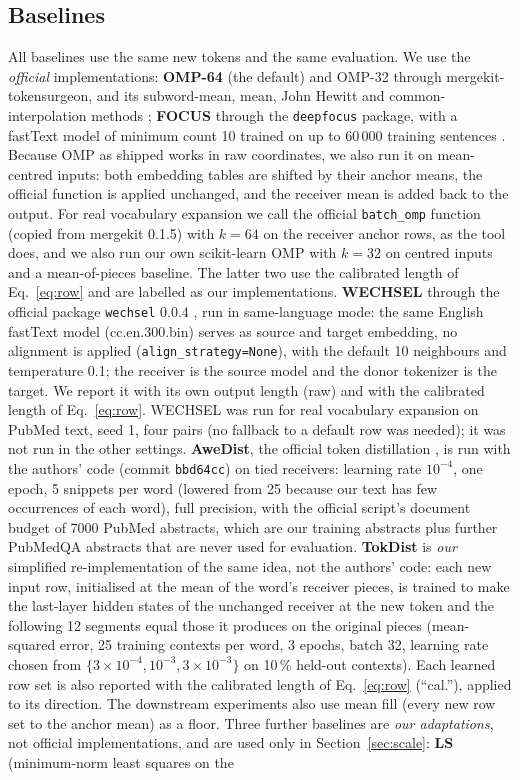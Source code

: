 \documentclass[preprint,12pt]{elsarticle}
\begin{document}
\subsection{Baselines}
All baselines use the same new tokens and the same evaluation. We use the \emph{official} implementations: \textbf{OMP-64} (the default) and OMP-32 through mergekit-tokensurgeon, and its subword-mean, mean, John Hewitt and common-interpolation methods \cite{goddard2024mergekit}; \textbf{FOCUS} through the \texttt{deepfocus} package, with a fastText model of minimum count 10 trained on up to 60\,000 training sentences \cite{dobler2023focus}. Because OMP as shipped works in raw coordinates, we also run it on mean-centred inputs: both embedding tables are shifted by their anchor means, the official function is applied unchanged, and the receiver mean is added back to the output. For real vocabulary expansion we call the official \texttt{batch\_omp} function (copied from mergekit 0.1.5) with $k=64$ on the receiver anchor rows, as the tool does, and we also run our own scikit-learn OMP with $k=32$ on centred inputs and a mean-of-pieces baseline. The latter two use the calibrated length of Eq.~\eqref{eq:row} and are labelled as our implementations. \textbf{WECHSEL} through the official package \texttt{wechsel} 0.0.4 \cite{minixhofer2022wechsel}, run in same-language mode: the same English fastText model (cc.en.300.bin) serves as source and target embedding, no alignment is applied (\texttt{align\_strategy=None}), with the default 10 neighbours and temperature 0.1; the receiver is the source model and the donor tokenizer is the target. We report it with its own output length (raw) and with the calibrated length of Eq.~\eqref{eq:row}. WECHSEL was run for real vocabulary expansion on PubMed text, seed 1, four pairs (no fallback to a default row was needed); it was not run in the other settings. \textbf{AweDist}, the official token distillation \cite{dobler2025tokendistillation}, is run with the authors' code (commit \texttt{bbd64cc}) on tied receivers: learning rate $10^{-4}$, one epoch, 5 snippets per word (lowered from 25 because our text has few occurrences of each word), full precision, with the official script's document budget of 7000 PubMed abstracts, which are our training abstracts plus further PubMedQA abstracts that are never used for evaluation. \textbf{TokDist} is \emph{our} simplified re-implementation of the same idea, not the authors' code: each new input row, initialised at the mean of the word's receiver pieces, is trained to make the last-layer hidden states of the unchanged receiver at the new token and the following 12 segments equal those it produces on the original pieces (mean-squared error, 25 training contexts per word, 3 epochs, batch 32, learning rate chosen from $\{3\times10^{-4},10^{-3},3\times10^{-3}\}$ on 10\,\% held-out contexts). Each learned row set is also reported with the calibrated length of Eq.~\eqref{eq:row} (``cal.''), applied to its direction. The downstream experiments also use mean fill (every new row set to the anchor mean) as a floor. Three further baselines are \emph{our adaptations}, not official implementations, and are used only in Section~\ref{sec:scale}: \textbf{LS} (minimum-norm least squares on the 
\end{document}
